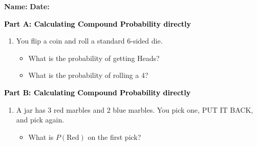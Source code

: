 \documentclass[12pt, letterpaper, fleqn]{article}
\newcommand{\blank}{\underline{\hspace{2.2cm}}}
\begin{document}
\textbf{Name:} \underline{\hspace{5cm}}
\hfill
\textbf{Date:} \underline{\hspace{3cm}}\\

\begin{tcolorbox}[colback=customteal!20]
\large\textcolor{black}{\textbf{Part A: Calculating Compound Probability directly}}
\end{tcolorbox}

\vspace{3mm}

\begin{enumerate}[itemsep=5.5cm, leftmargin=0.6cm]
\item You flip a coin and roll a standard $6$-sided die.
\begin{itemize}
\item What is the probability of getting Heads? \blank
\item What is the probability of rolling a $4$? \blank
\end{itemize}
\end{enumerate}

\newpage

\begin{tcolorbox}[colback=customteal!20]
\large\textcolor{black}{\textbf{Part B: Calculating Compound Probability directly}}
\end{tcolorbox}

\vspace{3mm}

\begin{enumerate}[itemsep=5.5cm, leftmargin=0.6cm, resume]
\begin{itemize}
\item Multiply them together: What is $P(\text{Heads AND a 4})$? \blank
\end{itemize}
\item A jar has $3$ red marbles and $2$ blue marbles. You pick one, PUT IT BACK, and pick again.
\begin{itemize}
\item What is $P(\text{Red})$ on the first pick? \blank
\end{itemize}
\end{enumerate}

\newpage
\end{document}
